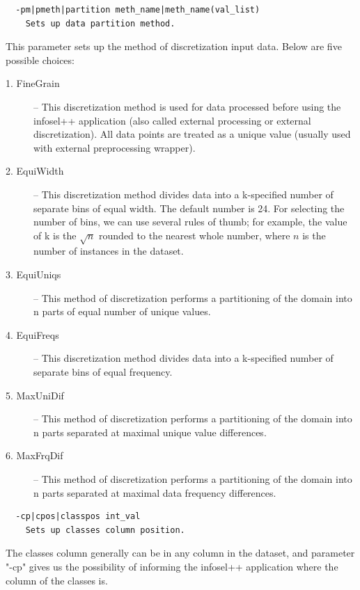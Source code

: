 \documentclass[a4paper,fleqn]{report}
\begin{document}
\begin{scriptsize}
 \begin{verbatim}
  -pm|pmeth|partition meth_name|meth_name(val_list)
    Sets up data partition method.
 \end{verbatim}
\end{scriptsize}
  This parameter sets up the method of discretization input data. Below are five possible choices:
\begin{description}
\item[1. FineGrain] -- This discretization method is used for data processed before using the infosel++ application 
                      (also called external processing or external discretization). All data points are treated as 
                       a unique value (usually used with external preprocessing wrapper).
\item[2. EquiWidth] -- This discretization method divides data into a k-specified number of separate bins of equal width. The default 
                      number is 24. For selecting the number of bins, we can use several rules of thumb; for example, the value of k is the $\sqrt{n}$ 
                      rounded to the nearest whole number, where $n$ is the number of instances in the dataset.
\item[3. EquiUniqs] -- This method of discretization performs a partitioning of the domain into n parts of equal number of unique values.
\item[4. EquiFreqs] -- This discretization method divides data into a k-specified number of separate bins of equal frequency.
\item[5. MaxUniDif] -- This method of discretization performs a partitioning of the domain into n parts separated at maximal unique value differences.
\item[6. MaxFrqDif] -- This method of discretization performs a partitioning of the domain into n parts separated at maximal data frequency differences.
\end{description}

\begin{scriptsize}
 \begin{verbatim}
  -cp|cpos|classpos int_val
    Sets up classes column position.
 \end{verbatim}
\end{scriptsize}
  The classes column generally can be in any column in the dataset, and parameter "-cp" gives us the possibility of informing 
the infosel++ application where the column of the classes is.
\end{document}
